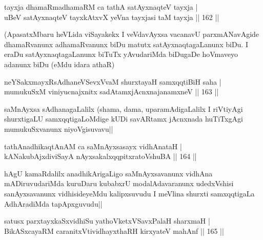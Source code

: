 \begin{shl}
tayxja dhamaRmadhamaRM ca tathA satAyxnaqteV tayxja |\\
uBeV satAyxnaqteV tayxkAtxvX yeVna tayxjasi taM tayxja \hfill || 162 ||
\end{shl}

\begin{artha}
(ApasatxMbaru heVLida viSayakekx I veVdavAyxsa vacanavU parxmANavAgide dhamaRvanunx adhamaRvanunx biDu matutx satAyxnaqtagaLanunx biDu. I eraDu satAyxnaqtagaLanunx biTuTx yAvudariMda biDugaDe hoVmaveyo adanunx biDu (eMdu idara athaR) 
\end{artha}

\begin{shl}
neYSakxmayxRsAdhaneVSevxVvaM shurxtayaH samxqqtiBiH saha |\\
mumukuSxM viniyucnajxnitx sadA\s \s tamxjAcnxnajanamxneV \hfill || 163 ||
\end{shl}

\begin{artha}
saMnAyxsa sAdhanagaLalilx (shama, dama, uparamAdigaLalilx I riVtiyAgi shurxtigaLU samxqqtigaLoMdige kUDi savARtamx jAcnxnada huTiTxgAgi mumukuSxvanunx niyoVgisuvavu||
\end{artha}


\begin{shl}
tathA\s nadhikaqtAnAM ca saMnAyxsasayx vidhAnataH |\\
kANakubAjxdiviSayA nAyxsakalxqqpitxratoV\s shuBA \hfill || 164 ||
\end{shl}

\begin{artha}
hAgU kamaRdalilx anadhikArigaLigo saMnAyxsavanunx vidhAna mADiruvudariMda kuruDaru kubabxrU modalAdavaranunx udedxVshisi sanAyxsavanunx vidhisideyeMdu kalipxsuvudu I meVlina shurxti samxqqtigaLa AdhAradiMda tapApxguvudu||
\end{artha}


\begin{shl}
satusx parxtayxkaSxvidhiSu yathoVketxVSavxPalaH sharxmaH |\\
BikASxcayaRM caranitxVtividhayxthaRH kirxyateV mahAnf \hfill || 165 ||
\end{shl}

